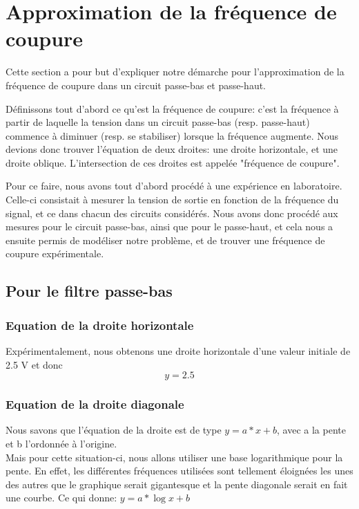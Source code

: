 \documentclass{article}
\begin{document}
 
\section{Approximation de la fréquence de coupure}

Cette section a pour but d'expliquer notre démarche pour l'approximation de la fréquence de coupure dans un circuit passe-bas et passe-haut. 

Définissons tout d'abord ce qu'est la fréquence de coupure: c'est la fréquence à partir de laquelle la tension dans un circuit passe-bas (resp. passe-haut) commence à diminuer (resp. se stabiliser) lorsque la fréquence augmente.
Nous devions donc trouver l'équation de deux droites: une droite horizontale, et une droite oblique. L'intersection de ces droites est appelée "fréquence de coupure".

Pour ce faire, nous avons tout d'abord procédé à une expérience en laboratoire. 
Celle-ci consistait à mesurer la tension de sortie en fonction de la fréquence du signal, et ce dans chacun des circuits considérés. 
Nous avons donc procédé aux mesures pour le circuit passe-bas, ainsi que pour le passe-haut, et cela nous a ensuite permis de modéliser notre problème, et de trouver une fréquence de coupure expérimentale.


\subsection{Pour le filtre passe-bas}

\subsubsection{Equation de la droite horizontale} %
Expérimentalement, nous obtenons une droite horizontale d'une valeur initiale de 2.5 V et donc \[y=2.5\]

\subsubsection{Equation de la droite diagonale}

Nous savons que l'équation de la droite est de type $y=a*x+b$, avec a la pente et b l'ordonnée à l'origine.
\\
Mais pour cette situation-ci, nous allons utiliser une base logarithmique pour la pente.  En effet, les différentes fréquences utilisées sont tellement éloignées les unes des autres que le graphique serait gigantesque et la pente diagonale serait en fait une courbe.  Ce qui donne: $y=a*\log{x}+b$
\end{document}
